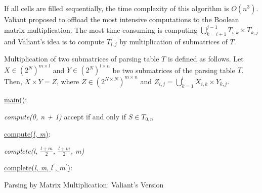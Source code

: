 If all cells are filled sequentially, the time complexity of this algorithm is $O(n^3)$.
Valiant proposed to offload the most intensive computations to the Boolean matrix multiplication. 
The most time-consuming is computing $\bigcup\limits_{k = i + 1}^{j - 1} T_{i, k} \times T_{k, j}$ and Valiant's idea is to compute $T_{i, j}$ by multiplication of submatrices of $T$.

Multiplication of two submatrices of parsing table $T$ is defined as follows.
Let $X \in (2^N)^{m \times l}$ and $Y \in (2^N)^{l \times n}$ be two submatrices of the parsing table $T$. 
Then, $X \times Y = Z$, where $Z \in (2^{N \times N})^{m \times n}$ and $Z_{i, j} = \bigcup\limits_{k = 1}^{l} X_{i, k} \times Y_{k, j}$.


\begin{algorithm}[h]
\SetAlgoNoLine
{}
\underline{main()}{:}{

 \textit{compute(0, n + 1)\;}
 accept if and only if $S \in T_{0, n}$
 \linebreak
 }

\underline{compute(\textit{l, m})}{:}{

 \textit{complete(l, $\frac{l+m}{2}$, $\frac{l+m}{2}$, m)}
 \linebreak
 }

\underline{complete(\textit{l, m}, $l^\prime$, $m^\prime$)}{:}{

 }
\caption{Parsing by Matrix Multiplication: Valiant's Version}
\label{algo:valiant}
\end{algorithm}



